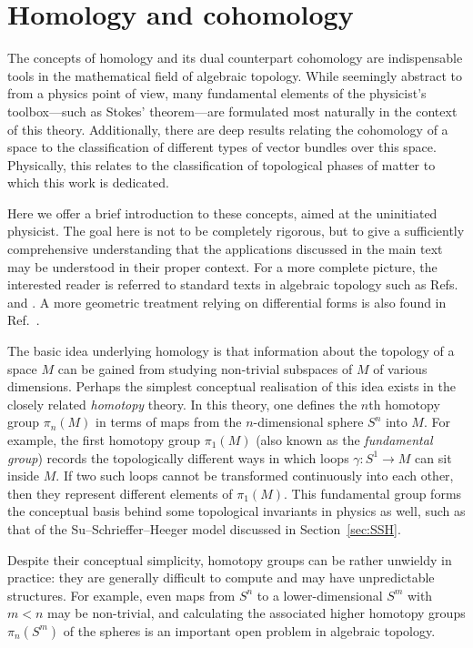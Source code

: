 \chapter{Homology and cohomology}\label{chap:homology}

The concepts of homology and its dual counterpart cohomology are indispensable tools in the mathematical field of algebraic topology. While seemingly abstract to from a physics point of view, many fundamental elements of the physicist's toolbox---such as Stokes' theorem---are formulated most naturally in the context of this theory. Additionally, there are deep results relating the cohomology of a space to the classification of different types of vector bundles over this space. Physically, this relates to the classification of topological phases of matter to which this work is dedicated.

Here we offer a brief introduction to these concepts, aimed at the uninitiated physicist. The goal here is not to be completely rigorous, but to give a sufficiently comprehensive understanding that the applications discussed in the main text %
may be understood in their proper context. For a more complete picture, the interested reader is referred to standard texts in algebraic topology such as Refs.~\cite{Hatcher_algebraic-topology} and \cite{Bredon_topo-geometry}. A more geometric treatment relying on differential forms is also found in Ref.~\cite{Bott-Tu_differential-forms}.

The basic idea underlying homology is that information about the topology of a space $M$ can be gained from studying non-trivial subspaces of $M$ of various dimensions. Perhaps the simplest conceptual realisation of this idea exists in the closely related \emph{homotopy} theory. In this theory, one defines the $n$th homotopy group $\pi_n(M)$ in terms of maps from the $n$-dimensional sphere $S^n$ into $M$. For example, the first homotopy group $\pi_1(M)$ (also known as the \emph{fundamental group}) records the topologically different ways in which loops $\gamma:S^1\to M$ can sit inside $M$. If two such loops cannot be transformed continuously into each other, then they represent different elements of $\pi_1(M)$. This fundamental group forms the conceptual basis behind some topological invariants in physics as well, such as that of the Su--Schrieffer--Heeger model discussed in Section~\ref{sec:SSH}.

Despite their conceptual simplicity, homotopy groups can be rather unwieldy in practice: they are generally difficult to compute and may have unpredictable structures. For example, even maps from $S^n$ to a lower-dimensional $S^m$ with $m<n$ may be non-trivial, and calculating the associated higher homotopy groups $\pi_n(S^m)$ of the spheres is an important open problem in algebraic topology.

